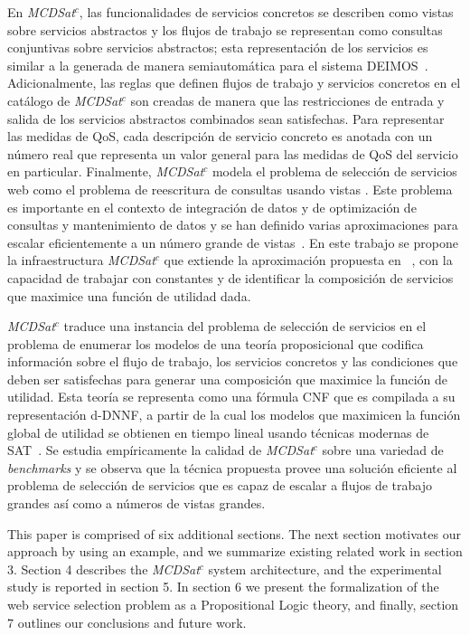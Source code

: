 \documentclass{llncs}
\begin{document}
En {\it MCDSat}$^c$, las funcionalidades de servicios concretos se describen
como vistas sobre servicios abstractos y los flujos de trabajo se representan
como consultas conjuntivas sobre servicios abstractos; esta representación de
los servicios es similar a la generada de manera semiautomática para el
sistema {\cal DEIMOS}~\cite{AmbiteISWC09}. Adicionalmente, las reglas
que definen flujos de trabajo y servicios concretos en el catálogo de
{\it MCDSat}$^c$ son creadas de manera que las restricciones de entrada y salida
de los servicios abstractos combinados sean satisfechas. Para representar las
medidas de QoS, cada descripción de servicio concreto es anotada con un número
real que representa un valor general para las medidas de QoS del servicio en
particular. Finalmente, {\it MCDSat}$^c$ modela el problema de selección de
servicios web como el problema de reescritura de consultas usando vistas
\cite{halevy:survey}. Este problema es importante en el contexto de integración
de datos \cite{Chen05,JaudoinPRST05} y de optimización de consultas y
mantenimiento de datos \cite{AfratiLU07,levy:bucket} y se han definido varias
aproximaciones para escalar eficientemente a un número grande de
vistas~\cite{arvelo:aaai06,pods:DuschkaG97,sac:DuschkaG97,levy:bucket,pottinger:minicon}.
En este trabajo se propone la infraestructura {\it MCDSat}$^c$ que extiende la
aproximación propuesta en  ~\cite{arvelo:aaai06}, con la capacidad de trabajar
con constantes y de identificar la composición de servicios que maximice una
función de utilidad dada.

{\it MCDSat}$^c$  traduce una instancia del problema de selección de servicios
en el problema de enumerar los modelos de una teoría proposicional que codifica
información sobre el flujo de trabajo, los servicios concretos y las condiciones
que deben ser satisfechas para generar una composición que maximice la función
de utilidad. Esta teoría se representa como una fórmula CNF que es compilada a
su representación d-DNNF, a partir de la cual los modelos que maximicen la
función global de utilidad se obtienen en tiempo lineal usando técnicas modernas
de SAT~\cite{darwiche:dnnf}. Se estudia empíricamente la calidad de {\it
MCDSat}$^c$ sobre una variedad de \emph{benchmarks} y se observa que la técnica
propuesta provee una solución eficiente al problema de selección de servicios
que es capaz de escalar a flujos de trabajo grandes así como a números de vistas
grandes.

This paper is comprised of six additional sections. The next section motivates our approach by using an example, and  we summarize existing related work in section 3. Section 4 describes the {\it MCDSat}$^c$ system architecture, and  the experimental study is reported in section 5. 
In section 6 we present the formalization of the web service selection problem as a Propositional Logic theory, and finally, section 7 outlines our conclusions and future work.
\end{document}
